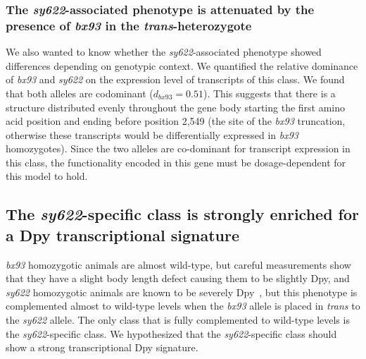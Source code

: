 \documentclass[10pt, twocolumn]{article}
\begin{document}
\subsubsection*{The \emph{sy622}-associated phenotype is attenuated by the presence
            of \emph{bx93} in the \emph{trans}-heterozygote}
We also wanted to know whether the \emph{sy622}-associated phenotype showed
differences depending on genotypic context. We quantified the relative dominance
of \emph{bx93} and \emph{sy622} on the expression level of transcripts of this
class. We found that both alleles are codominant ($d_{bx93} = 0.51$). This
suggests that there is a structure distributed evenly throughout the gene
body starting the first amino acid position and ending before position 2,549
(the site of the \emph{bx93} truncation, otherwise these transcripts would be
differentially expressed in \emph{bx93} homozygotes). Since the two alleles are
co-dominant for transcript expression in this class, the functionality encoded
in this gene must be dosage-dependent for this model to hold.

\subsection*{The \emph{sy622}-specific class is strongly enriched for a Dpy
             transcriptional signature}
\emph{bx93} homozygotic animals are almost wild-type, but careful measurements
show that they have a slight body length defect causing them to be slightly Dpy,
and \emph{sy622} homozygotic animals are known to be severely
Dpy~\cite{Moghal2003}, but this phenotype is complemented almost to wild-type
levels when the \emph{bx93} allele is placed in \emph{trans} to the \emph{sy622}
allele. The only class that is fully complemented to wild-type levels is the
\emph{sy622}-specific class. We hypothesized that the
\emph{sy622}-specific class should show a strong transcriptional Dpy signature.
\end{document}
